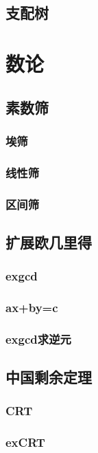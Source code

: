 ﻿\documentclass[a4paper,twocolumn]{article}
\begin{document}
\subsection{支配树}

\section{数论}
\subsection{素数筛}
\subsubsection{埃筛}

\subsubsection{线性筛}

\subsubsection{区间筛}

\subsection{扩展欧几里得}
\subsubsection{exgcd}

\subsubsection{ax+by=c}

\subsubsection{exgcd求逆元}

\subsection{中国剩余定理}
\subsubsection{CRT}

\subsubsection{exCRT}

\end{document}
